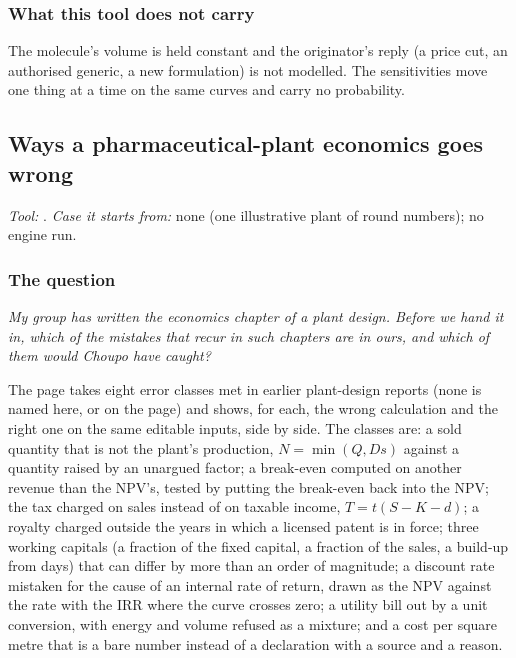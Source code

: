 \documentclass[11pt,a4paper]{article}
\begin{document}
\subsubsection*{What this tool does not carry}

The molecule's volume is held constant and the originator's reply
(a price cut, an authorised generic, a new formulation) is not modelled.
The sensitivities move one thing at a time on the same curves and carry no
probability.

\subsection{Ways a pharmaceutical-plant economics goes wrong}\label{sec:edu-economics-errors}


\noindent\textit{\small Tool:} .  \textit{\small
Case it starts from:} none (one illustrative plant of round numbers); no
engine run.

\subsubsection*{The question}

\emph{My group has written the economics chapter of a plant design.  Before
we hand it in, which of the mistakes that recur in such chapters are in ours,
and which of them would Choupo have caught?}

The page takes eight error classes met in earlier plant-design reports
(none is named here, or on the page) and shows, for each, the wrong
calculation and the right one on the same editable inputs, side by side.
The classes are: a sold quantity that is not the plant's production,
$N=\min(Q,Ds)$ against a quantity raised by an unargued factor; a
break-even computed on another revenue than the NPV's, tested by putting the
break-even back into the NPV; the tax charged on sales instead of on taxable
income, $T=t(S-K-d)$; a royalty charged outside the years in which a
licensed patent is in force; three working capitals (a fraction of the fixed
capital, a fraction of the sales, a build-up from days) that can differ by
more than an order of magnitude; a discount rate mistaken for the cause of
an internal rate of return, drawn as the NPV against the rate with the IRR
where the curve crosses zero; a utility bill out by a unit conversion, with
energy and volume refused as a mixture; and a cost per square metre that is
a bare number instead of a declaration with a source and a reason.
\end{document}
